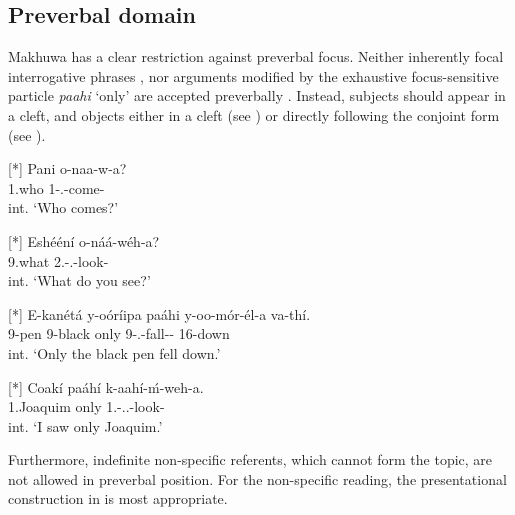 \documentclass[output=paper]{langscibook}
\begin{document}
\subsection{Preverbal domain}
\label{bkm:Ref114751328}
Makhuwa has a clear restriction against preverbal focus. Neither inherently focal interrogative phrases , nor arguments modified by the exhaustive focus-sensitive particle \textit{paahi} ‘only’ are accepted preverbally . Instead, subjects should appear in a cleft, and objects either in a cleft (see ) or directly following the conjoint form (see ).

\ea
\label{bkm:Ref96972813}
\ea
[*]{
\gll
Pani  o-naa-w-a?\\
1.who  1\SM{}-\PRS{}.\DJ{}-come-\FV{}\\
\glt
int. ‘Who comes?’\\
}

\ex
[*]{
\gll
Eshééní  o-náá-wéh-a?\\
9.what  2\SG{}.\SM{}-\PRS{}.\DJ{}-look-\FV{}\\
\glt
int. ‘What do you see?’ \citep[170]{vanderWal2009a}\\
}

\z
\z

\ea
\label{bkm:Ref96972827}
\ea
[*]{
\gll
E-kanétá  y-oóríipa  paáhi  y-oo-mór-él-a  va-thí.\\
9-pen  9-black  only  9\SM{}-\PFV{}.\DJ{}-fall-\APPL{}-\FV{}  16-down\\
\glt
int. ‘Only the black pen fell down.’\\
}


\ex
[*]{
\gll
Coakí paáhí k-aahí-ḿ-weh-a.\\
1.Joaquim  only  1\SG.\SM-\PST.\PFV.\OM{}-look-\FV{}\\
\glt
int. ‘I saw only Joaquim.’ \citep[171]{vanderWal2009a}\\
}

\z
\z

Furthermore, indefinite non-specific referents, which cannot form the topic, are not allowed in preverbal position. For the non-specific reading, the presentational construction in  is most appropriate.
\end{document}
